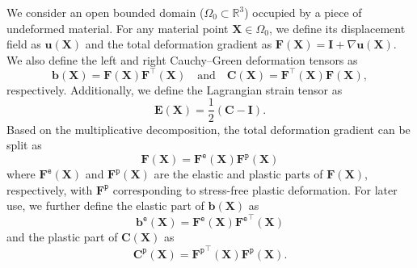 \documentclass[preprint,11pt]{elsarticle}
\theoremstyle{definition}
\begin{document}
We consider an open bounded domain ($\Omega_0 \subset \mathbb{R}^3$) occupied by a piece of undeformed material. For any material point $\mathbf{X} \in \Omega_0$, we define its displacement field as $\mathbf{u}(\mathbf{X})$ and the total deformation gradient as $\mathbf{F}(\mathbf{X}) = \mathbf{I} + \nabla \mathbf{u}(\mathbf{X})$. We also define the left and right Cauchy--Green deformation tensors as
\begin{equation*}
    \mathbf{b}(\mathbf{X}) = \mathbf{F}(\mathbf{X}) \mathbf{F}^\top(\mathbf{X})
    \quad \text{and} \quad
    \mathbf{C}(\mathbf{X}) = \mathbf{F}^\top(\mathbf{X}) \mathbf{F}(\mathbf{X}),
\end{equation*}
respectively. Additionally, we define the Lagrangian strain tensor as
\begin{equation} \label{Finite Strain Tensors}
    \mathbf{E}(\mathbf{X}) = \dfrac{1}{2}(\mathbf{C} - \mathbf{I}).
\end{equation}
Based on the multiplicative decomposition, the total deformation gradient can be split as
\begin{equation*}
    \mathbf{F}(\mathbf{X}) = \mathbf{F}^\texttt{e}(\mathbf{X}) \mathbf{F}^\texttt{p}(\mathbf{X})
\end{equation*}
where $\mathbf{F}^\texttt{e}(\mathbf{X})$ and $\mathbf{F}^\texttt{p}(\mathbf{X})$ are the elastic and plastic parts of $\mathbf{F}(\mathbf{X})$, respectively, with $\mathbf{F}^\texttt{p}$ corresponding to stress-free plastic deformation. For later use, we further define the elastic part of $\mathbf{b}(\mathbf{X})$ as
\begin{equation} \label{Elastic Part of b}
    \mathbf{b}^\texttt{e}(\mathbf{X})
    = \mathbf{F}^\texttt{e}(\mathbf{X}) {\mathbf{F}^\texttt{e}}^\top(\mathbf{X})
\end{equation}
and the plastic part of $\mathbf{C}(\mathbf{X})$ as
\begin{equation} \label{Plastic Part of C}
    \mathbf{C}^\texttt{p}(\mathbf{X})
    = {\mathbf{F}^\texttt{p}}^\top(\mathbf{X}) \mathbf{F}^\texttt{p}(\mathbf{X}).
\end{equation}
\end{document}
